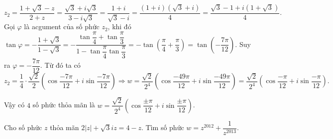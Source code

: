 \begin{ex}
\begin{vd}
{\begin{itemize}
			\[
			z_{2}=\dfrac{1+\sqrt{3}-z}{2+z}=\dfrac{\sqrt{3}+i\sqrt{3}}{3-i\sqrt{3}}=\dfrac{1+i}{\sqrt{3}-i}=\dfrac{(1+i)(\sqrt{3}+i)}{4}=\dfrac{\sqrt{3}-1+i(1+\sqrt{3})}{4}.
			\]
			Gọi $ \varphi $ là acgument của số phức $ z_{2} $, khi đó $ \tan\varphi=-\dfrac{1+\sqrt{3}}{1-\sqrt{3}}=-\dfrac{\tan\dfrac{\pi}{4}+\tan\dfrac{\pi}{3}}{1-\tan\dfrac{\pi}{4}\tan\dfrac{\pi}{3}}=-\tan\left(\dfrac{\pi}{4}+\dfrac{\pi}{3}\right)=\tan\left( -\dfrac{7\pi}{12}\right) $. Suy ra $ \varphi=-\dfrac{7\pi}{12} $. Từ đó ta có
			\[
			z_{2}=\dfrac{1}{4}\cdot \dfrac{\sqrt{2}}{2}\left(\cos\dfrac{-7\pi}{12}+i\sin\dfrac{-7\pi}{12}\right)\Rightarrow w=\dfrac{\sqrt{2}}{2^{4}}\left(\cos\dfrac{-49\pi}{12}+i\sin\dfrac{-49\pi}{12}\right)=\dfrac{\sqrt{2}}{2^{4}}\left(\cos\dfrac{-\pi}{12}+i\sin\dfrac{-\pi}{12}\right).
			\]
		\end{itemize}
		Vậy có $ 4 $ số phức thỏa mãn là $ w=\dfrac{\sqrt{2}}{2^{4}}\left(\cos\dfrac{\pm\pi}{12}+i\sin\dfrac{\pm\pi}{12}\right) $.
	}
\end{vd}
\begin{vd}%
	Cho số phức $ z $ thỏa mãn $ 2|z|+\sqrt{3}iz=4-z $. Tìm số phức $ w=z^{2012}+\dfrac{1}{z^{2013}} $.
\end{vd}
\begin{vd}%

\end{vd}
\end{ex}
